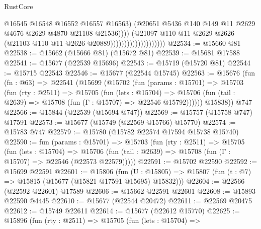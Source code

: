 \begin{lexlean}{RustCore}
\begin{coremodule}
                                                @16545
                                                @16548
                                                @16552
                                                @16557
                                                @16563)
                                              (@20651
                                                @5436
                                                @140
                                                @149
                                                @11
                                                @2629
                                                @4676
                                                @2629
                                                @4870
                                                @21108
                                                @21536))))
                                        (@21097
                                          @110
                                          @11
                                          @2629
                                          @2626
                                          (@21103 @110 @11 @2626 @20889))))))))))))))))))))
@22534 := @15660 @81
@22538 := @15662 (@15666 @81) (@15672 @81)
@22539 := @15681 @17588
@22541 := @15677 (@22539 @15696)
@22543 := @15719 (@15720 @81)
@22544 := @15715 @22543
@22546 := @15677 (@22544 @15745)
@22563 := @15676
    (fun (fn : @63) =>
    @22541
      (@15699
        (@15702
          (fun (params : @15701) =>
          @15703
            (fun (rty : @2511) =>
            @15705
              (fun (lets : @15704) =>
              @15706 (fun (tail : @2639) => @15708 (fun (Γ : @15707) => @22546 @15792))))))
        @15838))
    @747
@22566 := @15844 (@22539 (@15694 @747))
@22569 := @15757 (@15758 @747) @17591
@22573 := @15677 (@15749 (@22569 @15766) @15770)
@22574 := @15783 @747
@22579 := @15780 (@15782 @22574 @17594 @15738 @15740)
@22590 := fun (params : @15701) =>
  @15703
    (fun (rty : @2511) =>
    @15705
      (fun (lets : @15704) =>
      @15706 (fun (tail : @2639) => @15708 (fun (Γ : @15707) => @22546 (@22573 @22579)))))
@22591 := @15702 @22590
@22592 := @15699 @22591
@22601 := @15806
    (fun (U : @15805) => @15807 (fun (t : @7) => @15815 (@15677 (@15821 @17591 @15695) @15832)))
@22604 := @22566 (@22592 @22601) @17589
@22606 := @15662 @22591 @22601
@22608 := @15893 @22590 @4445
@22610 := @15677 (@22544 @20472)
@22611 := @22569 @20475
@22612 := @15749 @22611
@22614 := @15677 (@22612 @15770)
@22625 := @15896
    (fun (rty : @2511) =>
    @15705
      (fun (lets : @15704) =>

\end{coremodule}
\end{lexlean}
